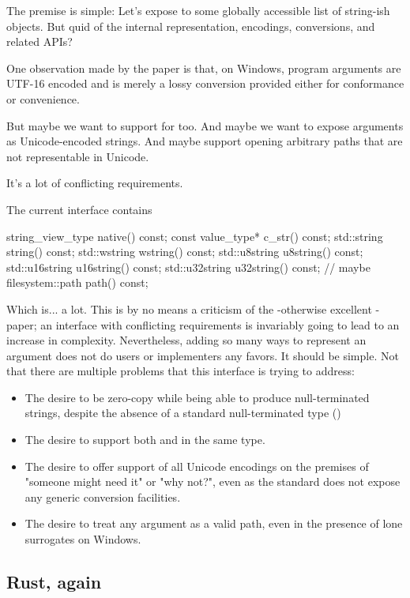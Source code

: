 \documentclass{wg21}
\begin{document}
The premise is simple: Let's expose  to some globally accessible list of string-ish objects.
But quid of the internal representation, encodings, conversions, and related APIs?

One observation made by the paper is that, on Windows, program arguments are UTF-16 encoded and 
is merely a lossy conversion provided either for conformance or convenience.

But maybe we want to support for  too. And maybe we want to expose arguments as Unicode-encoded strings.
And maybe support opening arbitrary paths that are not representable in Unicode.

It's a lot of conflicting requirements.

The current interface contains

\begin{colorblock}
string_view_type native() const;
const value_type* c_str() const;
std::string string() const;
std::wstring wstring() const;
std::u8string u8string() const;
std::u16string u16string() const;
std::u32string u32string() const;
// maybe
filesystem::path path() const;
\end{colorblock}

Which is... a lot. This is by no means a criticism of the -otherwise excellent - paper; an interface with conflicting requirements is invariably going to lead to an increase in complexity.
Nevertheless, adding so many ways to represent an argument does not do users or implementers any favors. It should be simple.
Not that there are multiple problems that this interface is trying to address:
\begin{itemize}
\item The desire to be zero-copy while being able to produce null-terminated strings, despite the absence of a standard null-terminated  type ()
\item The desire to support both  and  in the same type.
\item The desire to offer support of all Unicode encodings on the premises of "someone might need it" or "why not?", even as the standard does not expose any
generic conversion facilities.
\item The desire to treat any argument as a valid path, even in the presence of lone surrogates on Windows.
\end{itemize}

\subsection{Rust, again}
\end{document}
